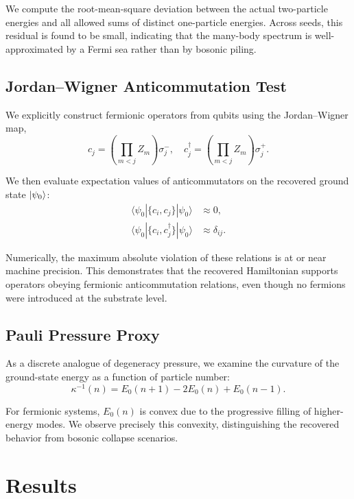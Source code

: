 \documentclass[11pt]{article}
\begin{document}
We compute the root-mean-square deviation between the actual two-particle energies and all allowed sums of distinct one-particle energies. Across seeds, this residual is found to be small, indicating that the many-body spectrum is well-approximated by a Fermi sea rather than by bosonic piling.

\subsection{Jordan--Wigner Anticommutation Test}

We explicitly construct fermionic operators from qubits using the Jordan--Wigner map,
\begin{equation}
c_j = \left( \prod_{m<j} Z_m \right) \sigma^-_j, \quad
c_j^\dagger = \left( \prod_{m<j} Z_m \right) \sigma^+_j.
\end{equation}

We then evaluate expectation values of anticommutators on the recovered ground state $\ket{\psi_0}$:
\begin{align}
\langle \psi_0 | \{c_i, c_j\} | \psi_0 \rangle &\approx 0, \\
\langle \psi_0 | \{c_i, c_j^\dagger\} | \psi_0 \rangle &\approx \delta_{ij}.
\end{align}

Numerically, the maximum absolute violation of these relations is at or near machine precision. This demonstrates that the recovered Hamiltonian supports operators obeying fermionic anticommutation relations, even though no fermions were introduced at the substrate level.

\subsection{Pauli Pressure Proxy}

As a discrete analogue of degeneracy pressure, we examine the curvature of the ground-state energy as a function of particle number:
\begin{equation}
\kappa^{-1}(n) = E_0(n+1) - 2E_0(n) + E_0(n-1).
\end{equation}

For fermionic systems, $E_0(n)$ is convex due to the progressive filling of higher-energy modes. We observe precisely this convexity, distinguishing the recovered behavior from bosonic collapse scenarios.

\section{Results}
\end{document}
